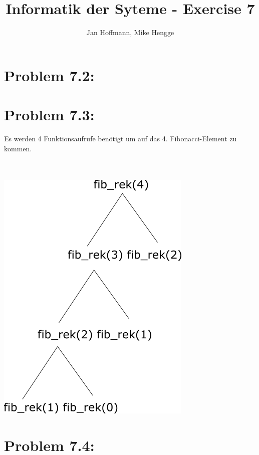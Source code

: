 \documentclass[10pt,a4paper]{article}
\title{Informatik der Syteme - Exercise 7}
\author{Jan Hoffmann, Mike Hengge}
\begin{document}
\section*{Problem 7.2:}

	
\section*{Problem 7.3:}
	\item Es werden 4 Funktionsaufrufe benötigt um auf das 4. Fibonacci-Element zu kommen. \\\\\\
	\begin{minipage}[t]{0.4\linewidth}				
						\includegraphics[scale=0.25]{baumstruktur.png}
					\end{minipage}	
\section*{Problem 7.4:}
\end{document}
